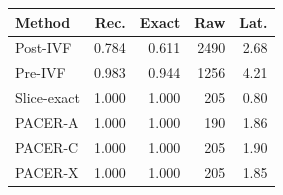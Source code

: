 \begin{tabular}{lrrrr}
\toprule
Method & Rec. & Exact & Raw & Lat.\\
\midrule
Post-IVF & 0.784 & 0.611 & 2490 & 2.68\\
Pre-IVF & 0.983 & 0.944 & 1256 & 4.21\\
Slice-exact & 1.000 & 1.000 & 205 & 0.80\\
PACER-A & 1.000 & 1.000 & 190 & 1.86\\
PACER-C & 1.000 & 1.000 & 205 & 1.90\\
PACER-X & 1.000 & 1.000 & 205 & 1.85\\
\bottomrule
\end{tabular}